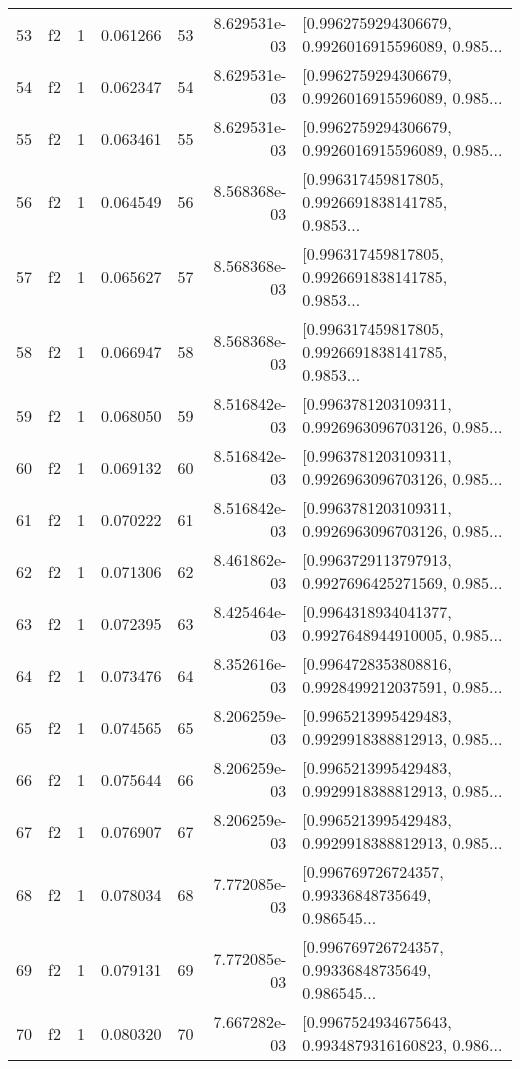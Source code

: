\begin{tabular}{lllrlrl}
53  &  f2 &   1 &  0.061266 &   53 &  8.629531e-03 &  [0.9962759294306679, 0.9926016915596089, 0.985... \\
54  &  f2 &   1 &  0.062347 &   54 &  8.629531e-03 &  [0.9962759294306679, 0.9926016915596089, 0.985... \\
55  &  f2 &   1 &  0.063461 &   55 &  8.629531e-03 &  [0.9962759294306679, 0.9926016915596089, 0.985... \\
56  &  f2 &   1 &  0.064549 &   56 &  8.568368e-03 &  [0.996317459817805, 0.9926691838141785, 0.9853... \\
57  &  f2 &   1 &  0.065627 &   57 &  8.568368e-03 &  [0.996317459817805, 0.9926691838141785, 0.9853... \\
58  &  f2 &   1 &  0.066947 &   58 &  8.568368e-03 &  [0.996317459817805, 0.9926691838141785, 0.9853... \\
59  &  f2 &   1 &  0.068050 &   59 &  8.516842e-03 &  [0.9963781203109311, 0.9926963096703126, 0.985... \\
60  &  f2 &   1 &  0.069132 &   60 &  8.516842e-03 &  [0.9963781203109311, 0.9926963096703126, 0.985... \\
61  &  f2 &   1 &  0.070222 &   61 &  8.516842e-03 &  [0.9963781203109311, 0.9926963096703126, 0.985... \\
62  &  f2 &   1 &  0.071306 &   62 &  8.461862e-03 &  [0.9963729113797913, 0.9927696425271569, 0.985... \\
63  &  f2 &   1 &  0.072395 &   63 &  8.425464e-03 &  [0.9964318934041377, 0.9927648944910005, 0.985... \\
64  &  f2 &   1 &  0.073476 &   64 &  8.352616e-03 &  [0.9964728353808816, 0.9928499212037591, 0.985... \\
65  &  f2 &   1 &  0.074565 &   65 &  8.206259e-03 &  [0.9965213995429483, 0.9929918388812913, 0.985... \\
66  &  f2 &   1 &  0.075644 &   66 &  8.206259e-03 &  [0.9965213995429483, 0.9929918388812913, 0.985... \\
67  &  f2 &   1 &  0.076907 &   67 &  8.206259e-03 &  [0.9965213995429483, 0.9929918388812913, 0.985... \\
68  &  f2 &   1 &  0.078034 &   68 &  7.772085e-03 &  [0.996769726724357, 0.99336848735649, 0.986545... \\
69  &  f2 &   1 &  0.079131 &   69 &  7.772085e-03 &  [0.996769726724357, 0.99336848735649, 0.986545... \\
70  &  f2 &   1 &  0.080320 &   70 &  7.667282e-03 &  [0.9967524934675643, 0.9934879316160823, 0.986... \\

\end{tabular}
